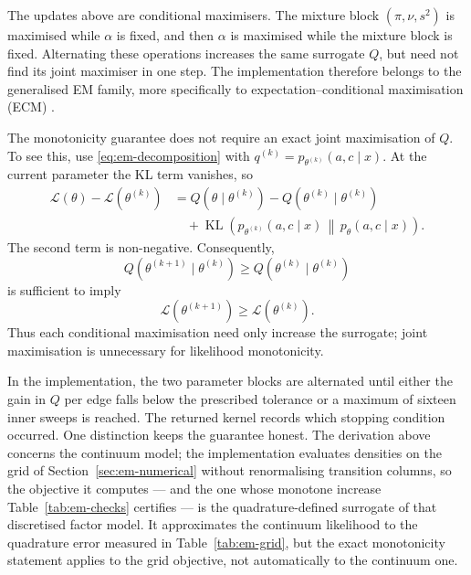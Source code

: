 The updates above are conditional maximisers. The mixture block
$(\pi,\nu,s^2)$ is maximised while $\alpha$ is fixed, and then $\alpha$ is
maximised while the mixture block is fixed. Alternating these operations
increases the same surrogate $Q$, but need not find its joint maximiser in one
step. The implementation therefore belongs to the generalised EM family, more
specifically to expectation--conditional maximisation (ECM)
\citep{meng1993maximum}.

The monotonicity guarantee does not require an exact joint maximisation of
$Q$. To see this, use \eqref{eq:em-decomposition} with
$q^{(k)}=p_{\theta^{(k)}}(a,c\mid x)$. At the current parameter the KL term
vanishes, so
\begin{align}
  \mathcal L(\theta)
  -
  \mathcal L(\theta^{(k)})
  &=
  Q(\theta\mid\theta^{(k)})
  -
  Q(\theta^{(k)}\mid\theta^{(k)})
  \nonumber\\
  &\quad+
  \operatorname{KL}\!\left(
    p_{\theta^{(k)}}(a,c\mid x)
    \,\middle\|\,
    p_\theta(a,c\mid x)
  \right).
  \label{eq:em-monotone}
\end{align}
The second term is non-negative. Consequently,
\begin{equation}
  Q(\theta^{(k+1)}\mid\theta^{(k)})
  \geq
  Q(\theta^{(k)}\mid\theta^{(k)})
\end{equation}
is sufficient to imply
\begin{equation}
  \boxed{
  \mathcal L(\theta^{(k+1)})
  \geq
  \mathcal L(\theta^{(k)}).
  }
  \label{eq:em-likelihood-monotone}
\end{equation}
Thus each conditional maximisation need only increase the surrogate; joint
maximisation is unnecessary for likelihood monotonicity.

In the implementation, the two parameter blocks are alternated until either
the gain in $Q$ per edge falls below the prescribed tolerance or a maximum of
sixteen inner sweeps is reached. The returned kernel records which stopping
condition occurred. One distinction keeps the guarantee honest. The derivation
above concerns the continuum model; the implementation evaluates densities on
the grid of Section~\ref{sec:em-numerical} without renormalising transition
columns, so the objective it computes --- and the one whose monotone increase
Table~\ref{tab:em-checks} certifies --- is the quadrature-defined surrogate of
that discretised factor model. It approximates the continuum likelihood to the
quadrature error measured in Table~\ref{tab:em-grid}, but the exact
monotonicity statement applies to the grid objective, not automatically to the
continuum one.

